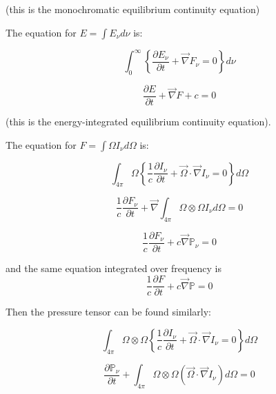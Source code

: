 \documentclass{template}
\begin{document}
(this is the monochromatic equilibrium continuity equation)

The equation for $E = \int E_\nu d\nu$ is:

\begin{equation}
    \int_0^\infty \left\{\frac{\partial E_\nu}{\partial t} + \vec{\nabla}F_\nu = 0 \right\} d\nu
\end{equation}

\begin{equation}
    \boxed{\frac{\partial E}{\partial t} + \vec{\nabla}F + c  = 0}
\end{equation}

(this is the energy-integrated equilibrium continuity equation).



The equation for $F = \int \Omega I_\nu d\Omega $ is:

\begin{equation}
    \int_{4\pi} \Omega {\left\{\frac{1}{c}\frac{\partial I_\nu}{\partial t} + \vec{\Omega}\cdot\vec{\nabla}I_\nu =0\right\}} d\Omega
\end{equation}

\begin{equation}
    \frac{1}{c}\frac{\partial F_\nu}{\partial t} + \vec{\nabla}\int_{4\pi} {\Omega \otimes \Omega I_\nu d\Omega} = 0
\end{equation}

\begin{equation}
    \boxed{\frac{1}{c}\frac{\partial F_\nu}{\partial t} + c\vec{\nabla}\mathbb{P}_\nu = 0}
\end{equation}

and the same equation integrated over frequency is
\begin{equation}
    \boxed{\frac{1}{c}\frac{\partial F}{\partial t} + c\vec{\nabla}\mathbb{P} = 0}
\end{equation}

Then the pressure tensor can be found similarly:

\begin{equation}
    \int_{4\pi} \Omega \otimes \Omega {\left\{\frac{1}{c}\frac{\partial I_\nu}{\partial t} + \vec{\Omega}\cdot\vec{\nabla}I_\nu =0\right\}} d\Omega
\end{equation}

\begin{equation}
    \boxed{\frac{\partial \mathbb{P_\nu}}{\partial t} +  \int_{4\pi} \Omega \otimes \Omega (\vec{\Omega}\cdot\vec{\nabla}I_\nu)d\Omega = 0}
\end{equation}
\end{document}
